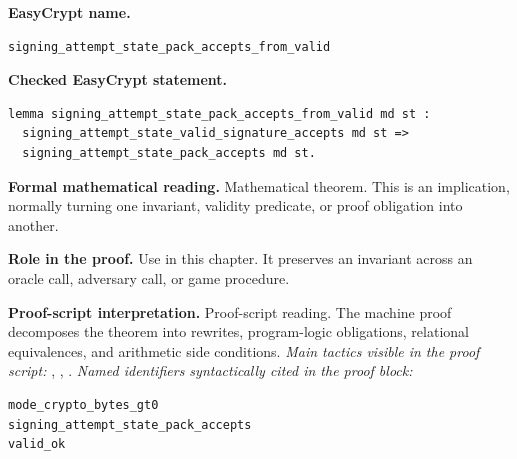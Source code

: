 \begin{formaltheorem}
\noindent\textbf{EasyCrypt name.}
\begin{lstlisting}[language=EasyCrypt,basicstyle=\ttfamily\scriptsize]
signing_attempt_state_pack_accepts_from_valid
\end{lstlisting}
\noindent\textbf{Checked EasyCrypt statement.}
\begin{lstlisting}[language=EasyCrypt,basicstyle=\ttfamily\scriptsize]
lemma signing_attempt_state_pack_accepts_from_valid md st :
  signing_attempt_state_valid_signature_accepts md st =>
  signing_attempt_state_pack_accepts md st.
\end{lstlisting}
\noindent\textbf{Formal mathematical reading.}
Mathematical theorem. This is an implication, normally turning one invariant, validity predicate, or proof obligation into another.

\noindent\textbf{Role in the proof.}
Use in this chapter. It preserves an invariant across an oracle call, adversary call, or game procedure.

\noindent\textbf{Proof-script interpretation.}
Proof-script reading. The machine proof decomposes the theorem into rewrites, program-logic obligations, relational equivalences, and arithmetic side conditions.
\emph{Main tactics visible in the proof script:} , , .
\emph{Named identifiers syntactically cited in the proof block:}
\begin{lstlisting}[language=EasyCrypt,basicstyle=\ttfamily\scriptsize]
mode_crypto_bytes_gt0
signing_attempt_state_pack_accepts
valid_ok
\end{lstlisting}

\end{formaltheorem}

